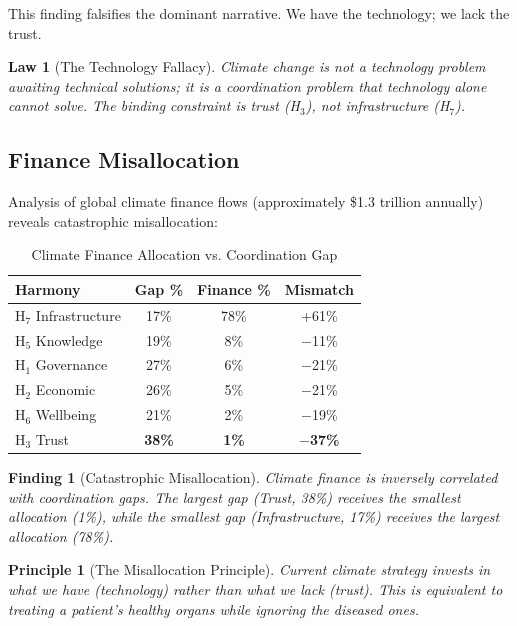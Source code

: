 \documentclass[12pt,a4paper]{article}
\newtheorem{finding}{Finding}
\newtheorem{law}{Law}
\newtheorem{principle}{Principle}
\begin{document}
This finding falsifies the dominant narrative. We have the technology; we lack the trust.

\begin{law}[The Technology Fallacy]
Climate change is not a technology problem awaiting technical solutions; it is a coordination problem that technology alone cannot solve. The binding constraint is trust (H$_3$), not infrastructure (H$_7$).
\end{law}

\subsection{Finance Misallocation}

Analysis of global climate finance flows (approximately \$1.3 trillion annually) reveals catastrophic misallocation:

\begin{table}[H]
\centering
\caption{Climate Finance Allocation vs. Coordination Gap}
\label{tab:finance}
\begin{tabular}{lccc}
\toprule
\textbf{Harmony} & \textbf{Gap \%} & \textbf{Finance \%} & \textbf{Mismatch} \\
\midrule
H$_7$ Infrastructure & 17\% & 78\% & +61\% \\
H$_5$ Knowledge & 19\% & 8\% & $-$11\% \\
H$_1$ Governance & 27\% & 6\% & $-$21\% \\
H$_2$ Economic & 26\% & 5\% & $-$21\% \\
H$_6$ Wellbeing & 21\% & 2\% & $-$19\% \\
H$_3$ Trust & \textbf{38\%} & \textbf{1\%} & \textbf{$-$37\%} \\
\bottomrule
\end{tabular}
\end{table}

\begin{finding}[Catastrophic Misallocation]
Climate finance is inversely correlated with coordination gaps. The largest gap (Trust, 38\%) receives the smallest allocation (1\%), while the smallest gap (Infrastructure, 17\%) receives the largest allocation (78\%).
\end{finding}

\begin{principle}[The Misallocation Principle]
Current climate strategy invests in what we have (technology) rather than what we lack (trust). This is equivalent to treating a patient's healthy organs while ignoring the diseased ones.
\end{principle}
\end{document}
